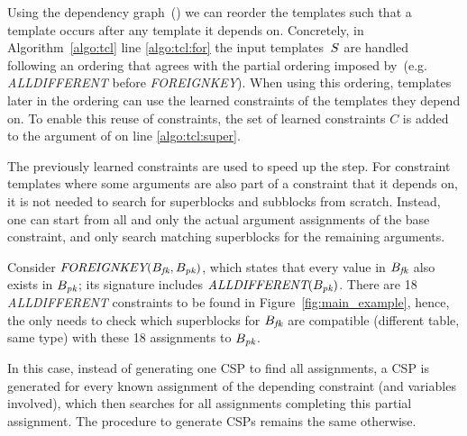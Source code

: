 Using the dependency graph~(\dependencies) we can reorder the templates such that a template occurs after any template it depends on.
Concretely, in Algorithm~\ref{algo:tcl} line \ref{algo:tcl:for} the input templates~$S$ are handled following an ordering that agrees with the partial ordering imposed by~\dependencies (e.g. \textit{ALLDIFFERENT} before \textit{FOREIGNKEY}).
When using this ordering, templates later in the ordering can use the learned constraints of the templates they depend on.
To enable this reuse of constraints, the set of learned constraints $C$ is added to the argument of \generategroups on line \ref{algo:tcl:super}.

The previously learned constraints are used to speed up the \generategroups step. For constraint templates where some arguments are also part of a constraint that it depends on, it is not needed to search for superblocks and subblocks from scratch. Instead, one can start from all and only the actual argument assignments of the base constraint, and only search matching superblocks for the remaining arguments.

\begin{example}
  Consider $\textit{FOREIGNKEY}(B_{\textit{fk}},B_{\textit{pk}})$, which states that every value in $B_{\textit{fk}}$ also exists in $B_{\textit{pk}}$; its signature includes $\textit{ALLDIFFERENT}(B_{\textit{pk}})$. There are 18 \textit{ALLDIFFERENT} constraints to be found in Figure~\ref{fig:main_example}, hence, the \generategroups only needs to check which superblocks for $B_{\textit{fk}}$ are compatible (different table, same type) with these 18 assignments to $B_{\textit{pk}}$.
\end{example}

In this case, instead of generating one CSP to find all assignments, a CSP is generated for every known assignment of the depending constraint (and variables involved), which then searches for all assignments completing this partial assignment.
The procedure to generate CSPs remains the same otherwise.





